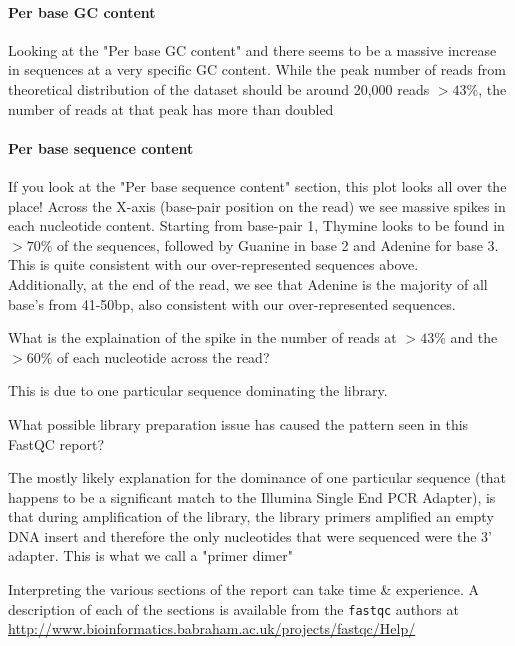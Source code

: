 \paragraph{Per base GC content}
Looking at the "Per base GC content" and there seems to be a massive increase in sequences at a very specific GC content. While the peak number of reads from theoretical distribution of the dataset should be around 20,000 reads $>43$\%, the number of reads at that peak has more than doubled

\paragraph{Per base sequence content}
If you look at the "Per base sequence content" section, this plot looks all over the place! Across the X-axis (base-pair position on the read) we see massive spikes in each nucleotide content. Starting from base-pair 1, Thymine looks to be found in $>70$\% of the sequences, followed by Guanine in base 2 and Adenine for base 3. This is quite consistent with our over-represented sequences above. \\
Additionally, at the end of the read, we see that Adenine is the majority of all base's from 41-50bp, also consistent with our over-represented sequences.

\begin{questions}
What is the explaination of the spike in the number of reads at $>43$\% and the $>60$\% of each nucleotide across the read? \\
\begin{answer}
This is due to one particular sequence dominating the library.
\end{answer}
What possible library preparation issue has caused the pattern seen in this FastQC report?
\begin{answer}
The mostly likely explanation for the dominance of one particular sequence (that happens to be a significant match to the Illumina Single End PCR Adapter), is that during amplification of the library, the library primers amplified an empty DNA insert and therefore the only nucleotides that were sequenced were the 3' adapter.
This is what we call a "primer dimer"
\end{answer}
\end{questions}


\begin{information}
Interpreting the various sections of the report can take time \& experience.
A description of each of the sections is available from the \texttt{fastqc} authors at \url{http://www.bioinformatics.babraham.ac.uk/projects/fastqc/Help/}
\end{information}

